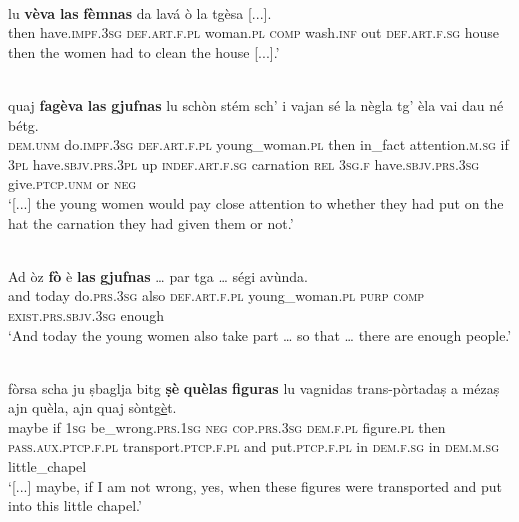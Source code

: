 \ea
\label{}
\\
\gll [...] lu \textbf{vèva} \textbf{las} \textbf{fèmnas} da lavá ò la tgèsa [...].   \\
{} then have.\textsc{impf.3sg} \textsc{def.art.f.pl} woman.\textsc{pl} \textsc{comp} wash.\textsc{inf} out \textsc{def.art.f.sg} house\\
\glt [...] then the women had to clean the house [...].'
\z

\ea
\label{}
\\
\gll    [...] quaj \textbf{fagèva} \textbf{las} \textbf{gjufnas} lu schòn stém sch’ i vajan sé la nègla tg’ èla vai dau né bétg.\\
{} \textsc{dem.unm} do.\textsc{impf.3sg} \textsc{def.art.f.pl} young\_woman.\textsc{pl} then in\_fact attention.\textsc{m.sg} if \textsc{3pl}  have.\textsc{sbjv.prs.3pl} up \textsc{indef.art.f.sg} carnation \textsc{rel} \textsc{3sg.f} have.\textsc{sbjv.prs.3sg}  give.\textsc{ptcp.unm} or \textsc{neg} \\
\glt `[...] the young women would pay close attention to whether they had put on the hat the carnation they had given them or not.'
\z

\ea
\label{}
\\
\gll    Ad òz \textbf{fò} è \textbf{las} \textbf{gjufnas} … par tga … ségi avùnda.\\
and today do.\textsc{prs.3sg} also  \textsc{def.art.f.pl} young\_woman.\textsc{pl} {} \textsc{purp} \textsc{comp} {} \textsc{exist.prs.sbjv.3sg} enough\\
\glt `And today the young women also take part … so that … there are enough people.'
\z

\ea
\label{}
\\
\gll  [...] fòrsa scha ju ṣbaglja bitg \textbf{ṣè} \textbf{quèlas} \textbf{figuras} lu vagnidas trans-pòrtadaṣ a mézaṣ ajn quèla, ajn quaj sòntg\underline{è}t.\\
{} maybe if \textsc{1sg} be\_wrong.\textsc{prs.1sg} \textsc{neg} \textsc{cop.prs.3sg} \textsc{dem.f.pl} figure.\textsc{pl} then \textsc{pass.aux.ptcp.f.pl} transport.\textsc{ptcp.f.pl} and put.\textsc{ptcp.f.pl} in \textsc{dem.f.sg} in \textsc{dem.m.sg} little\_chapel\\
\glt `[...] maybe, if I am not wrong, yes, when these figures were transported and put into this little chapel.'
\z

